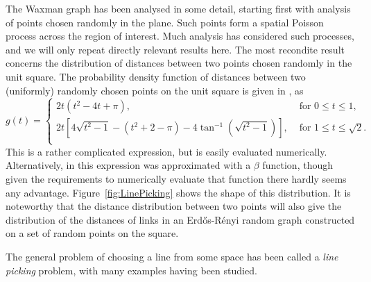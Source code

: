 \documentclass{article}
\begin{document}
The Waxman graph has been analysed in some detail, starting first with
analysis of points chosen randomly in the plane. Such points form a
spatial Poisson process across the region of interest. Much analysis
has considered such processes, and we will only repeat directly
relevant results here. The most recondite result concerns the
distribution of distances between two points chosen randomly in the
unit square.  The probability density function of distances between
two (uniformly) randomly chosen points on the unit square is given in
\cite{weisstein:_squar_line_picking}, as
\begin{equation}
  \label{eq:square_line}
  g(t) = \left\{ \begin{array}{ll}
      2t (t^2-4t+\pi), & \mbox{ for } 0 \leq t \leq 1, \\
      2t \left[4 \sqrt{t^2-1} - (t^2+2-\pi) - 4 \tan^{-1} \left(\sqrt{t^2-1} \right)\right], 
               & \mbox{ for } 1 \leq t \leq \sqrt{2} . \\ 
    \end{array} \right.
\end{equation}
This is a rather complicated expression, but is easily evaluated
numerically. Alternatively, in
\cite{m.naldi05:_connec_of_waxman_graph} this expression was
approximated with a $\beta$ function, though given the requirements to
numerically evaluate that function there hardly seems any advantage.
Figure~\ref{fig:LinePicking} shows the shape of this distribution.
It is noteworthy that the distance distribution between two points
will also give the distribution of the distances of links in an
Erd\H{o}s-R\'enyi random graph constructed on a set of random points
on the square.


The general problem of choosing a line from some space has been called
a {\em line picking} problem, with many examples having been studied.
\end{document}

